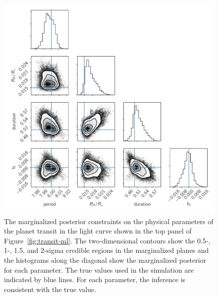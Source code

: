 \documentclass[manuscript, letterpaper]{aastex6}
\makeatletter
\let\origsubsection\subsection
\renewcommand\subsection{\@ifstar{\starsubsection}{\nostarsubsection}}
\newcommand\nostarsubsection[1]{\subsectionprelude\origsubsection{#1}}
\newcommand\starsubsection[1]{\subsectionprelude\origsubsection*{#1}}
\newcommand\subsectionprelude{\vspace{1em}}
\newcommand{\figureref}[1]{\ref{fig:#1}}
\newcommand{\Figure}[1]{Figure~\figureref{#1}}
\newcommand{\figurelabel}[1]{\label{fig:#1}}
\makeatother
\begin{document}
\begin{figure}[!p]
\begin{center}
\includegraphics[width=\textwidth]{figures/transit/transit-corner.pdf}
\caption{The marginalized posterior constraints on the physical parameters of
    the planet transit in the light curve shown in the top panel of
    \Figure{transit-ml}.
    The two-dimensional contours show the 0.5-, 1-, 1.5, and 2-sigma credible
    regions in the marginalized planes and the histograms along the diagonal
    show the marginalized posterior for each parameter.
    The true values used in the simulation are indicated by blue lines.
    For each parameter, the inference is consistent with the true value.
    \figurelabel{transit-corner}}
\end{center}
\end{figure}

\subsection{Summary}
\end{document}
